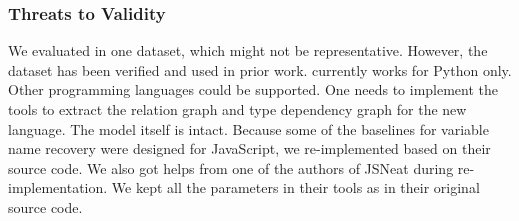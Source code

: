 \subsubsection{Threats to Validity}
\label{sec:threats}

We evaluated in one dataset, which might not be
representative. However, the dataset has been verified and used in
prior work. {\tool} currently works for Python only. Other programming
languages could be supported. One needs to implement the tools to
extract the relation graph and type dependency graph for the new
language. The model itself is intact. Because some of the baselines
for variable name recovery were designed for JavaScript, we
re-implemented based on their source code. We also got helps from one
of the authors of JSNeat during re-implementation. We kept all the
parameters in their tools as in their original source code.

